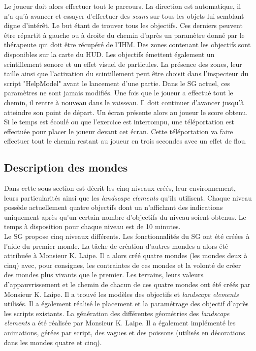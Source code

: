 		Le joueur doit alors effectuer tout le parcours. La direction est automatique, il n'a qu'à avancer et essayer d'effectuer des \textit{scans} sur tous les objets lui semblant digne d'intérêt. Le but étant de trouver tous les objectifs. Ces derniers peuvent être répartit à gauche ou à droite du chemin d'après un paramètre donné par le thérapeute qui doit être récupéré de l'IHM. Des zones contenant les objectifs sont disponibles sur la carte du HUD. Les objectifs émettent également un scintillement sonore et un effet visuel de particules. La présence des zones, leur taille ainsi que l'activation du scintillement peut être choisit dans l'inspecteur du script "HelpModel" avant le lancement d'une partie. Dans le SG actuel, ces paramètres ne sont jamais modifiés.
		Une fois que le joueur a effectué tout le chemin, il rentre à nouveau dans le vaisseau. Il doit continuer d'avancer jusqu'à atteindre son point de départ. Un écran présente alors au joueur le score obtenu.
		\\
		
		Si le temps est écoulé ou que l'exercice est interrompu, une téléportation est effectuée pour placer le joueur devant cet écran. Cette téléportation va faire effectuer tout le chemin restant au joueur en trois secondes avec un effet de flou.
		
	\subsection*{Description des mondes}	
		Dans cette sous-section est décrit les cinq niveaux créés, leur environnement, leurs particularités ainsi que les \textit{landscape elements} qu'ils utilisent. Chaque niveau possède actuellement quatre objectifs dont un n'affichant des indications uniquement après qu'un certain nombre d'objectifs du niveau soient obtenus. Le temps à disposition pour chaque niveau est de 10 minutes.
		\\
		
		Le SG propose cinq niveaux différents. Les fonctionnalités du SG ont été créées à l'aide du premier monde. La tâche de création d'autres mondes a alors été attribuée à Monsieur K. Laipe. Il a alors créé quatre mondes (les mondes deux à cinq) avec, pour consignes, les contraintes de ces mondes et la volonté de créer des mondes plus vivants que le premier. Les terrains, leurs valeurs d'appauvrissement et le chemin de chacun de ces quatre mondes ont été créés par Monsieur K. Laipe. Il a trouvé les modèles des objectifs et \textit{landscape elements} utilisés. Il a également réalisé le placement et la paramétrage des objectif d'après les scripts existants. La génération des différentes géométries des \textit{landscape elements} a été réalisée par Monsieur K. Laipe. Il a également implémenté les animations, gérées par script, des vagues et des poissons (utilisés en décorations dans les mondes quatre et cinq).
		
